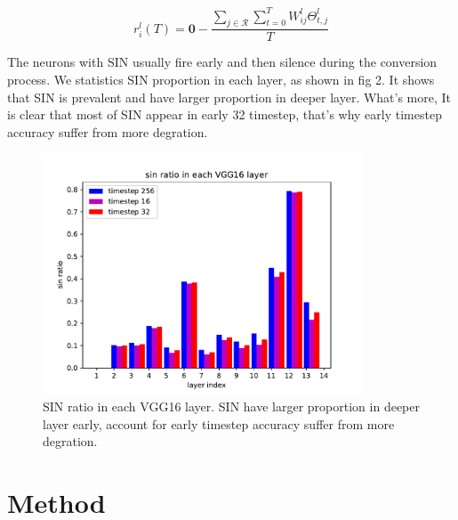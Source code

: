 \documentclass{article}
\begin{document}
\begin{equation}
  r_i^l(T) = \mathbf{0} - \frac{\sum_{j \in \mathcal{R}} \sum_{t=0}^TW_{ij}^l\Theta_{t,j}^l }{T}
\end{equation}

The neurons with SIN usually fire early and then silence during the conversion process.
We statistics SIN proportion in each layer, as shown in fig 2. It shows that SIN is prevalent and have larger proportion in deeper layer.
What's more, It is clear that most of SIN appear in early 32 timestep, that's why early timestep accuracy suffer from more degration.
\begin{figure}[htbp]
  \centering
  \includegraphics[width=0.85\textwidth]{./fig/sin_ratio.pdf}
  \caption{SIN ratio in each VGG16 layer. SIN have larger proportion in deeper layer early, account for early timestep accuracy suffer from more degration.}
\end{figure}

\section{Method}
\end{document}

